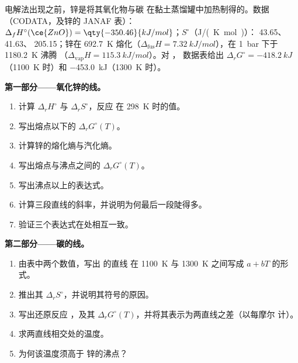 \begin{problem}
\label{pb:b2:ellingham:1}
电解法出现之前，锌是将其氧化物与碳
在黏土蒸馏罐中加热制得的。数据（CODATA，及锌的 JANAF 表）：$\Delta_f H^\circ(\ce{ZnO})
= \qty{-350.46}{kJ/mol}$；$S^\circ$（\unit{J/(K.mol)}）： 43.65、
41.63、 205.15；锌在 \qty{692.7}{K} 熔化（$\Delta_{\text{fus}}H =
\qty{7.32}{kJ/mol}$），在 \qty{1}{bar} 下于 \qty{1180.2}{K} 沸腾
（$\Delta_{\text{vap}}H = \qty{115.3}{kJ/mol}$）。对 ，
数据表给出 $\Delta_r G^\circ = \qty{-418.2}{kJ}$（\qty{1100}{K} 时）和
\qty{-453.0}{kJ}（\qty{1300}{K} 时）。

\medskip
\noindent\textbf{第一部分——氧化锌的线。}
\begin{enumerate}
  \item 计算 $\Delta_r H^\circ$ 与 $\Delta_r S^\circ$，反应  在 \qty{298}{K} 时的值。
  \item 写出熔点以下的 $\Delta_r G^\circ(T)$。
  \item 计算锌的熔化熵与汽化熵。
  \item 写出熔点与沸点之间的 $\Delta_r G^\circ(T)$。
  \item 写出沸点以上的表达式。
  \item 计算三段直线的斜率，并说明为何最后一段陡得多。
  \item 验证三个表达式在处相互一致。
\end{enumerate}

\medskip
\noindent\textbf{第二部分——碳的线。}
\begin{enumerate}[resume]
  \item 由表中两个数值，写出  的直线
        在 \qty{1100}{K} 与 \qty{1300}{K} 之间写成 $a + bT$ 的形式。
  \item 推出其 $\Delta_r S^\circ$，并说明其符号的原因。
  \item 写出还原反应 ，及其 $\Delta_r
        G^\circ(T)$，并将其表示为两直线之差（以每摩尔  计）。
  \item 求两直线相交处的温度。
  \item 为何该温度须高于
        锌的沸点？
\end{enumerate}


\end{problem}
